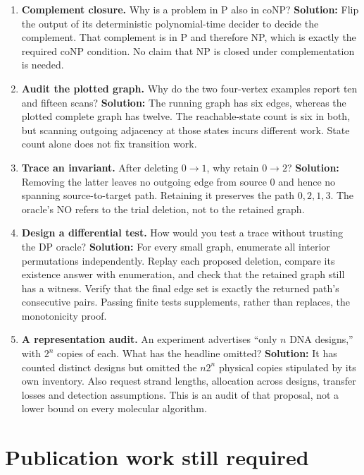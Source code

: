 \begin{enumerate}
  count is \(2^{2k}\). A polynomial expression in the numeric value is
  not a polynomial in the encoded length.
\item
  \textbf{Complement closure.} Why is a problem in P also in coNP?
  \textbf{Solution:} Flip the output of its deterministic
  polynomial-time decider to decide the complement. That complement is
  in P and therefore NP, which is exactly the required coNP condition.
  No claim that NP is closed under complementation is needed.
\item
  \textbf{Audit the plotted graph.} Why do the two four-vertex examples
  report ten and fifteen scans? \textbf{Solution:} The running graph has
  six edges, whereas the plotted complete graph has twelve. The
  reachable-state count is six in both, but scanning outgoing adjacency
  at those states incurs different work. State count alone does not fix
  transition work.
\item
  \textbf{Trace an invariant.} After deleting \(0\to1\), why retain
  \(0\to2\)? \textbf{Solution:} Removing the latter leaves no outgoing
  edge from source 0 and hence no spanning source-to-target path.
  Retaining it preserves the path \(0,2,1,3\). The oracle's NO refers to
  the trial deletion, not to the retained graph.
\item
  \textbf{Design a differential test.} How would you test a trace
  without trusting the DP oracle? \textbf{Solution:} For every small
  graph, enumerate all interior permutations independently. Replay each
  proposed deletion, compare its existence answer with enumeration, and
  check that the retained graph still has a witness. Verify that the
  final edge set is exactly the returned path's consecutive pairs.
  Passing finite tests supplements, rather than replaces, the
  monotonicity proof.
\item
  \textbf{A representation audit.} An experiment advertises ``only \(n\)
  DNA designs,'' with \(2^n\) copies of each. What has the headline
  omitted? \textbf{Solution:} It has counted distinct designs but
  omitted the \(n2^n\) physical copies stipulated by its own inventory.
  Also request strand lengths, allocation across designs, transfer
  losses and detection assumptions. This is an audit of that proposal,
  not a lower bound on every molecular algorithm.
\end{enumerate}

\section{Publication work still
required}\label{publication-work-still-required}

